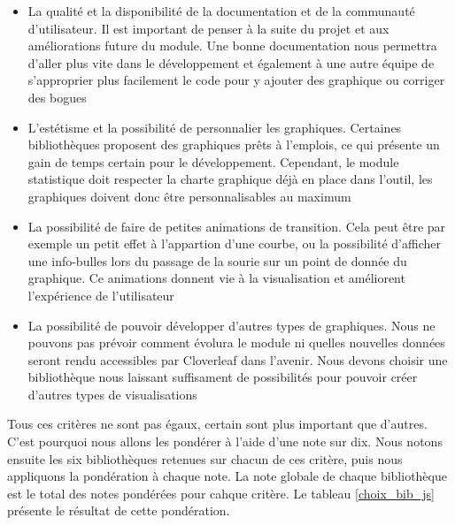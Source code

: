 			\begin{itemize}
			  \item La qualité et la disponibilité de la documentation et de la
			  communauté d'utilisateur. Il est important de penser à la suite du projet
			  et aux améliorations future du module. Une bonne documentation nous
			  permettra d'aller plus vite dans le développement et également à une autre
			  équipe de s'approprier plus facilement le code pour y
			  ajouter des graphique ou corriger des bogues
			  \item L'estétisme et la possibilité de personnalier les graphiques.
			  Certaines bibliothèques proposent des graphiques prêts à l'emplois, ce qui
			  présente un gain de temps certain pour le développement. Cependant, le module
			  statistique doit respecter la charte graphique déjà en place dans l'outil,
			  les graphiques doivent donc être personnalisables au maximum
			  \item La possibilité de faire de petites animations de transition. Cela
			  peut être par exemple un petit effet à l'appartion d'une courbe, ou la
			  possibilité d'afficher une info-bulles lors du passage de la sourie sur un
			  point de donnée du graphique. Ce animations donnent vie à la visualisation
			  et améliorent l'expérience de l'utilisateur
			  \item La possibilité de pouvoir développer d'autres types de graphiques.
			  Nous ne pouvons pas prévoir comment évolura le module ni quelles nouvelles
			  données seront rendu accessibles par Cloverleaf dans l'avenir. Nous devons
			  choisir une bibliothèque nous laissant suffisament de possibilités pour
			  pouvoir créer d'autres types de visualisations
			\end{itemize}
			Tous ces critères ne sont pas égaux, certain sont plus important que
			d'autres. C'est pourquoi nous allons les pondérer à l'aide d'une note sur
			dix. Nous notons ensuite les six bibliothèques retenues sur chacun de ces
			critère, puis nous appliquons la pondération à chaque note. La note globale
			de chaque bibliothèque est le total des notes pondérées pour cahque critère.
			Le tableau \ref{choix_bib_js} présente le résultat de cette pondération.
